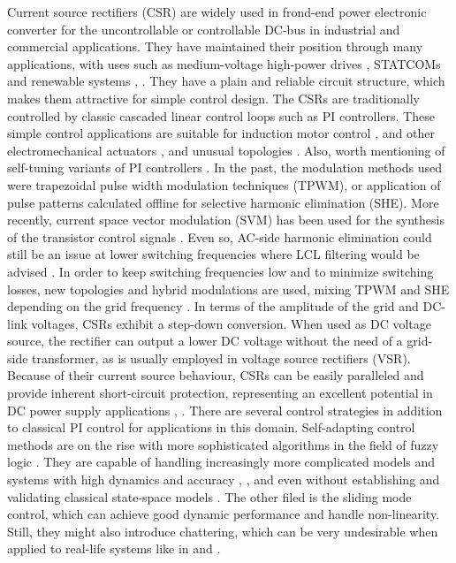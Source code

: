     Current source rectifiers (CSR) are widely used in frond-end power electronic converter for the uncontrollable or controllable DC-bus in industrial and commercial applications. They have maintained their position through many applications, with uses such as medium-voltage high-power drives \cite{vajda2017limiting}, \cite{ghalem2010six} STATCOMs \cite{gupta2014two} and renewable systems \cite{chen2016single}, \cite{exposto2015predictive}. They have a plain and reliable circuit structure, which makes them attractive for simple control design. The CSRs are traditionally controlled by classic cascaded linear control loops such as PI controllers. These simple control applications are suitable for induction motor control \cite{chebre2011speed}, and other electromechanical actuators \cite{salloum2014robust}, and unusual topologies \cite{neukirchner2017voltage}. Also, worth mentioning of self-tuning variants of PI controllers \cite{tahri2012digital}. In the past, the modulation methods used were trapezoidal pulse width modulation techniques (TPWM), or application of pulse patterns calculated offline for selective harmonic elimination (SHE). More recently, current space vector modulation (SVM) has been used for the synthesis of the transistor control signals \cite{gao2017model}. Even so, AC-side harmonic elimination could still be an issue at lower switching frequencies where LCL filtering would be advised \cite{han2010control}. In order to keep switching frequencies low and to minimize switching losses, new topologies and hybrid modulations are used, mixing TPWM and SHE depending on the grid frequency \cite{venkatraman2018multilevel}.
    In terms of the amplitude of the grid and DC-link voltages, CSRs exhibit a step-down conversion. When used as DC voltage source, the rectifier can output a lower DC voltage without the need of a grid-side transformer, as is usually employed in voltage source rectifiers (VSR). Because of their current source behaviour, CSRs can be easily paralleled and provide inherent short-circuit protection, representing an excellent potential in DC power supply applications \cite{feroura2017finite}, \cite{yan2015study}.
    There are several control strategies in addition to classical PI control for applications in this domain. Self-adapting control methods are on the rise with more sophisticated algorithms in the field of fuzzy logic \cite{urmos2017application}. They are capable of handling increasingly more complicated models and systems with high dynamics and accuracy \cite{chatterjee2008augmented}, \cite{haidegger2012simulation}, and even without establishing and validating classical state-space models \cite{vrkalovic2018model}. The other filed is the sliding mode control, which can achieve good dynamic performance and handle non-linearity. Still, they might also introduce chattering, which can be very undesirable when applied to real-life systems like in \cite{regaya2014new} and \cite{szell2014mathematical}.
